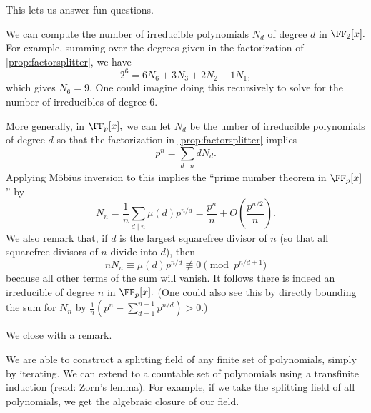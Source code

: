 \documentclass[../notes.tex]{subfiles}
\begin{document}
This lets us answer fun questions.
\begin{example}
	We can compute the number of irreducible polynomials $N_d$ of degree $d$ in $\FF_2[x].$ For example, summing over the degrees given in the factorization of \autoref{prop:factorsplitter}, we have
	\[2^6=6N_6+3N_3+2N_2+1N_1,\]
	which gives $N_6=9.$ One could imagine doing this recursively to solve for the number of irreducibles of degree $6.$
\end{example}
\begin{remark}[Nir]
	More generally, in $\FF_p[x],$ we can let $N_d$ be the umber of irreducible polynomials of degree $d$ so that the factorization in \autoref{prop:factorsplitter} implies
	\[p^n=\sum_{d\mid n}dN_d.\]
	Applying M\"obius inversion to this implies the ``prime number theorem in $\FF_p[x]$'' by
	\[N_n=\frac1n\sum_{d\mid n}\mu(d)p^{n/d}=\frac{p^n}n+O\left(\frac{p^{n/2}}n\right).\]
	We also remark that, if $d$ is the largest squarefree divisor of $n$ (so that all squarefree divisors of $n$ divide into $d$), then
	\[nN_n\equiv\mu(d)p^{n/d}\not\equiv0\pmod{p^{n/d+1}}\]
	because all other terms of the sum will vanish. It follows there is indeed an irreducible of degree $n$ in $\FF_p[x].$ (One could also see this by directly bounding the sum for $N_n$ by $\frac1n\left(p^n-\sum_{d=1}^{n-1}p^{n/d}\right)>0.$)
\end{remark}
We close with a remark.
\begin{remark}
	We are able to construct a splitting field of any finite set of polynomials, simply by iterating. We can extend to a countable set of polynomials using a transfinite induction (read: Zorn's lemma). For example, if we take the splitting field of all polynomials, we get the algebraic closure of our field.
\end{remark}
\end{document}
